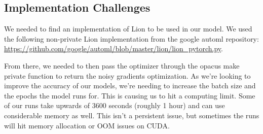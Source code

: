 \subsection{Implementation Challenges}\label{subsec:implementation-challenges2}
We needed to find an implementation of Lion to be used in our model. We used the following non-private Lion implementation from the google automl repository: 
\url{https://github.com/google/automl/blob/master/lion/lion_pytorch.py}. 

From there, we needed to then pass the optimizer through the opacus make private function to return the noisy gradients optimization.
As we're looking to improve the accuracy of our models, we're needing to increase the batch size and the epochs the model runs for. This is causing us to hit a computing
limit. Some of our runs take upwards of 3600 seconds (roughly 1 hour) and can use considerable memory as well. This isn't a persistent issue, but sometimes the runs will hit memory
allocation or OOM issues on CUDA.
